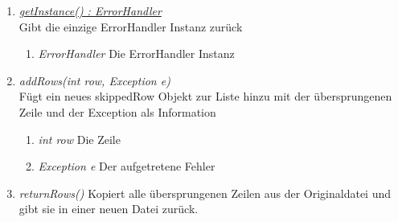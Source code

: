 \begin{enumerate}[+]
	\item \underline{\textit{getInstance() : ErrorHandler}} \\ Gibt die einzige ErrorHandler Instanz zurück
\begin{enumerate}[$\circ$]
 	\item \textit{ErrorHandler} Die ErrorHandler Instanz
\end{enumerate}
\item \textit{addRows(int row, Exception e)	}
\\Fügt ein neues skippedRow Objekt zur Liste hinzu mit der übersprungenen Zeile und der Exception als Information 
\begin{enumerate}[$\bullet$]
	\item \textit{int row} Die Zeile
	\item \textit{Exception e} Der aufgetretene Fehler
\end{enumerate}
\item \textit{returnRows()} Kopiert alle übersprungenen Zeilen aus der Originaldatei und gibt sie in einer neuen Datei zurück.
\end{enumerate}


